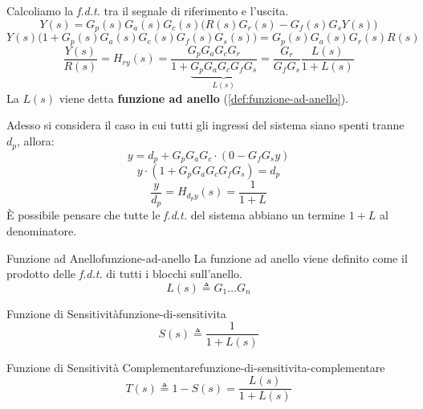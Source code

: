 \documentclass[12pt]{article}
\begin{document}
Calcoliamo la \emph{f.d.t.} tra il segnale di riferimento e l'uscita.
\[ Y(s) = G_p(s)G_a(s)G_c(s) \Big(R(s)G_r(s) - G_f(s)G_sY(s)\Big) \]
\[ Y(s) \Big(1 + G_p(s)G_a(s)G_c(s)G_f(s)G_s(s) \Big) = G_p(s)G_a(s)G_r(s)R(s) \]
\[ \frac{Y(s)}{R(s)} = H _{ry}(s) = \frac{G_pG_aG_cG_r}{1 + \underbrace{G_pG_aG_cG_fG_s}_{L(s)} } = \frac{G_r}{G_fG_s} \frac{L(s)}{1 + L(s)}   \]
La $L(s)$ viene detta \textbf{funzione ad anello} (\ref{def:funzione-ad-anello}).

Adesso si considera il caso in cui tutti gli ingressi del sistema siano spenti tranne $d_p$, allora:
\[ y = d_p + G_pG_aG_c \cdot ( 0 - G_fG_s y) \]
\[ y \cdot (1 + G_pG_aG_cG_fG_s ) = d_p \]
\[ \boxed{ \frac{y}{d_p} = H _{d_p y}(s) = \frac{1}{1+L} }  \]
\`E possibile pensare che tutte le \emph{f.d.t.} del sistema abbiano un termine $1+L$ al denominatore.


\begin{definition}{Funzione ad Anello}{funzione-ad-anello}
    La funzione ad anello viene definito come il prodotto delle \emph{f.d.t.} di tutti i blocchi sull'anello.
    \[ L(s) \triangleq G_1\dots G_n \]
\end{definition}

\begin{definition}{Funzione di Sensitivit\`a}{funzione-di-sensitivita}
    \[ S(s) \triangleq \frac{1}{1+L(s)}  \]
\end{definition}

\begin{definition}{Funzione di Sensitivit\`a Complementare}{funzione-di-sensitivita-complementare}
    \[ T(s) \triangleq 1 - S(s) = \frac{L(s)}{1 + L(s)}  \]
\end{definition}
\end{document}
